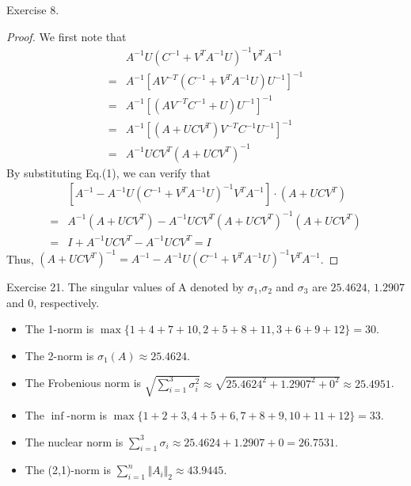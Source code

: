 \documentclass{article}
\begin{document}
\begin{section}{Exercise 8.}
\begin{proof}
We first note that
\begin{equation}
\begin{aligned}
&A^{-1}U(C^{-1}+V^{T}A^{-1}U)^{-1}V^{T}A^{-1} \\
=&A^{-1}[AV^{-T}(C^{-1}+V^{T}A^{-1}U)U^{-1}]^{-1} \\
=&A^{-1}[(AV^{-T}C^{-1}+U)U^{-1}]^{-1}\\
=&A^{-1}[(A+UCV^{T})V^{-T}C^{-1}U^{-1}]^{-1}\\
=&A^{-1}UCV^{T}(A+UCV^{T})^{-1}
\end{aligned}  
\end{equation}
By substituting Eq.(1), we can verify that
$$
\begin{aligned}
&[A^{-1} - A^{-1}U(C^{-1}+V^{T}A^{-1}U)^{-1}V^{T}A^{-1}]\cdot(A+UCV^{T}) \\
=&A^{-1}(A+UCV^{T}) - A^{-1}UCV^{T}(A+UCV^{T})^{-1}(A+UCV^{T})\\
=&I + A^{-1}UCV^{T}-A^{-1}UCV^{T} = I
\end{aligned} 
$$
Thus, $(A+UCV^{T})^{-1} = A^{-1} - A^{-1}U(C^{-1}+V^{T}A^{-1}U)^{-1}V^{T}A^{-1}$.
\end{proof}
\end{section}

\begin{section}{Exercise 21.}
The singular values of A denoted by $\sigma_1$,$\sigma_2$ and $\sigma_3$ are $25.4624$, $1.2907$ and $0$, respectively.
\begin{itemize}
    \item The 1-norm is $\max\{1+4+7+10,2+5+8+11,3+6+9+12\}=30$.
    \item The 2-norm is $\sigma_1(A) \approx 25.4624$.
    \item The Frobenious norm is $\sqrt{\sum_{i=1}^{3}\sigma_i^2}\approx\sqrt{25.4624^2 +1.2907^2+0^2} \approx25.4951 $.
    \item The $\inf$-norm is $\max\{1+2+3,4+5+6,7+8+9,10+11+12\}=33$.
    \item The nuclear norm is $\sum_{i=1}^{3}\sigma_i \approx 25.4624 +1.2907+0 = 26.7531$.
    \item The (2,1)-norm is $\sum_{i=1}^{n}\Vert A_i \Vert_2 \approx 43.9445$.
\end{itemize}

\end{section}
\end{document}
